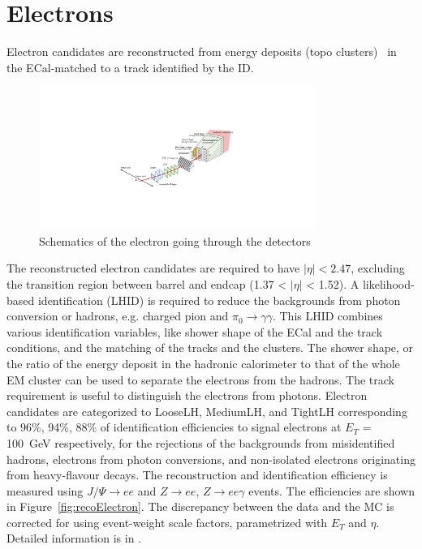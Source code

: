 \section{Electrons}
Electron candidates are reconstructed from energy deposits (topo clusters)~\cite{ATL-PHYS-PUB-2017-022} in the ECal-matched to a track identified by the ID.
\begin{figure}[tbp]
\begin{center}
 \includegraphics[width=0.80\textwidth,keepaspectratio]{figures/Reconstruction/electronPath}
\caption{
Schematics of the electron going through the detectors
}
\label{fig:electronPath}
\end{center}
\end{figure}
The reconstructed electron candidates are required to have $|\eta|<2.47$, excluding the transition region between barrel and endcap (1.37 < $|\eta|$ < 1.52).
A likelihood-based identification (LHID) is required to reduce the backgrounds from photon conversion or hadrons, e.g. charged pion and $\pi_0 \rightarrow \gamma \gamma$. 
This LHID combines various identification variables, like shower shape of the ECal and the track conditions, and the matching of the tracks and the clusters. The shower shape, or the ratio of the energy deposit in the hadronic calorimeter to that of the whole EM cluster can be used to separate the electrons from the hadrons. The track requirement is useful to distinguish the electrons from photons. Electron candidates are categorized to LooseLH, MediumLH, and TightLH corresponding to 96\%, 94\%, 88\% of identification efficiencies to signal electrons at $E_T$ = 100~GeV respectively, for the rejections of the backgrounds from misidentified hadrons, electrons from photon conversions, and non-isolated electrons originating from heavy-flavour decays. 
The reconstruction and identification efficiency is measured using  $J/\Psi \rightarrow ee$ and $Z\rightarrow ee$, $Z\rightarrow ee\gamma$ events. The efficiencies are shown in Figure~\ref{fig:recoElectron}. The discrepancy between the data and the MC is corrected for using event-weight scale factors, parametrized with $E_T$ and $\eta$. Detailed information is in \cite{PERF-2017-01}.
